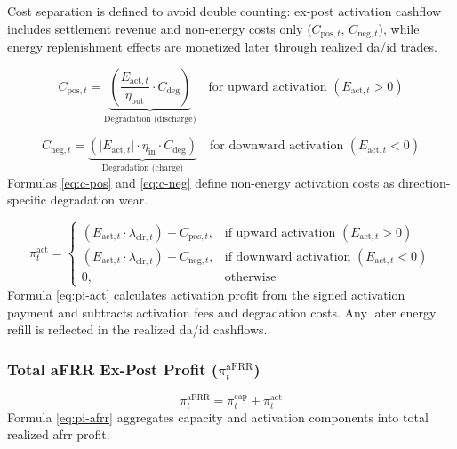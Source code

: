 Cost separation is defined to avoid double counting: ex-post activation cashflow includes settlement revenue and non-energy costs only ($C_{\text{pos}, t}$, $C_{\text{neg}, t}$), while energy replenishment effects are monetized later through realized \gls{da}/\gls{id} trades.

\begin{equation}\label{eq:c-pos}
    C_{\text{pos}, t} =
    \underbrace{\left( \frac{E_{\text{act}, t}}{\eta_{\text{out}}} \cdot C_{\text{deg}} \right)}_{\text{Degradation (discharge)}}
    \quad \text{for upward activation } (E_{\text{act}, t} > 0)
\end{equation}

\begin{equation}\label{eq:c-neg}
    C_{\text{neg}, t} =
    \underbrace{\left( \lvert E_{\text{act}, t}\rvert \cdot \eta_{\text{in}} \cdot C_{\text{deg}} \right)}_{\text{Degradation (charge)}}
    \quad \text{for downward activation } (E_{\text{act}, t} < 0)
\end{equation}
Formulas \ref{eq:c-pos} and \ref{eq:c-neg} define non-energy activation costs as direction-specific degradation wear.

\begin{equation}\label{eq:pi-act}
    \pi_{t}^{\text{act}} =
    \begin{cases}
        (E_{\text{act}, t} \cdot \lambda_{\text{clr}, t}) - C_{\text{pos}, t}, & \text{if upward activation } (E_{\text{act}, t} > 0)   \\
        (E_{\text{act}, t} \cdot \lambda_{\text{clr}, t}) - C_{\text{neg}, t}, & \text{if downward activation } (E_{\text{act}, t} < 0) \\
        0,                                                                     & \text{otherwise}
    \end{cases}
\end{equation}
Formula \ref{eq:pi-act} calculates activation profit from the signed activation payment and subtracts activation fees and degradation costs. Any later energy refill is reflected in the realized \gls{da}/\gls{id} cashflows.

\subsubsection{Total aFRR Ex-Post Profit ($\pi_{t}^{\text{aFRR}}$)}


\begin{equation}\label{eq:pi-afrr}
    \pi_{t}^{\text{aFRR}} = \pi_{t}^{\text{cap}} + \pi_{t}^{\text{act}}
\end{equation}
Formula \ref{eq:pi-afrr} aggregates capacity and activation components into total realized \gls{afrr} profit.

